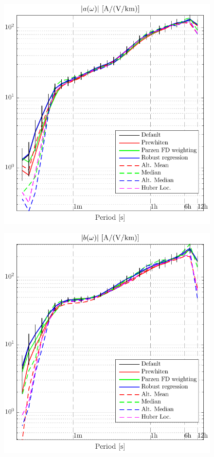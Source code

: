 \documentclass[draft,linenumbers]{agujournal2018}
\begin{document}
\clearpage

\begin{figure}[h]
\begin{minipage}[t]{.48\linewidth}
\includegraphics[width=\textwidth]{figures/plot_options_comparison_a.pdf}
\label{plot_options_comparison_a}
\end{minipage}
\begin{minipage}[t]{.48\linewidth}
\includegraphics[width=\textwidth]{figures/plot_options_comparison_b.pdf}

\end{minipage}
\end{figure}
\end{document}
